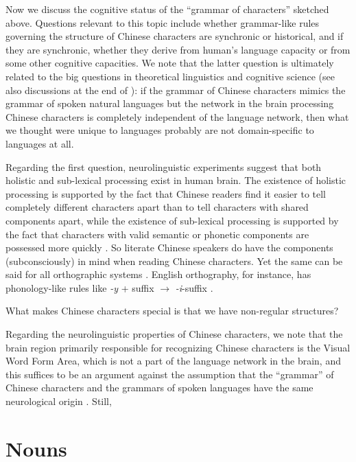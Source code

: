 \documentclass[UTF8, a4paper, oneside, scheme=plain, 12pt]{ctexrep}
\newcommand*{\textto}{$\to$}
\newcommand*{\citesec}[1]{\S~{#1}}
\newcommand*{\citepage}[1]{p.~{#1}}
\newcommand*{\citepages}[1]{pp.~{#1}}
\newcommand{\form}[1]{\emph{#1}}
\begin{document}
\small{
    Now we discuss the cognitive status of the ``grammar of characters'' sketched above.
    Questions relevant to this topic include whether grammar-like rules governing the structure of Chinese characters are synchronic or historical,
    and if they are synchronic, whether they derive from human's language capacity or from some other cognitive capacities.
    We note that the latter question is ultimately related to the big questions in theoretical linguistics and cognitive science (see also discussions at the end of ):
    if the grammar of Chinese characters mimics the grammar of spoken natural languages but the network in the brain processing Chinese characters is completely independent of the language network,
    then what we thought were unique to languages probably are not domain-specific to languages at all.
    
    Regarding the first question, neurolinguistic experiments suggest that both holistic and sub-lexical processing exist in human brain.
    The existence of holistic processing is supported by the fact that Chinese readers find it easier to tell completely different characters apart than to tell characters with shared components apart,
    while the existence of sub-lexical processing is supported by the fact that characters with valid semantic or phonetic components are possessed more quickly
    \citep[\citesec{2.2}]{duan2024chinese}.
    So literate Chinese speakers do have the components (subconsciously) in mind when reading Chinese characters.
    Yet the same can be said for all orthographic systems \citep[\citepages{23-25}]{myers2019grammar}.
    English orthography, for instance, has phonology-like rules like \form{-y} + suffix \textto{}  \form{-i}-suffix \citep[\citepage{26}]{myers2019grammar}.
    
    What makes Chinese characters special is that we have non-regular structures?
    
    Regarding the neurolinguistic properties of Chinese characters,
    we note that the brain region primarily responsible for recognizing Chinese characters
    is the Visual Word Form Area, which is not a part of the language network in the brain,
    and this suffices to be an argument against the assumption that the ``grammar'' of Chinese characters and the grammars of spoken languages have the same neurological origin \citep[\citepages{209-210}]{myers2019grammar}.
    Still, 
}



\chapter{Nouns}
\end{document}
